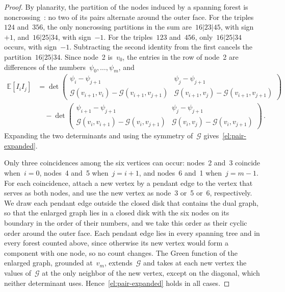 \documentclass[11pt]{amsart}
\numberwithin{equation}{section}
\newcommand{\EE}{\mathbb E}
\begin{document}
\begin{proof}
By planarity, the partition of the nodes induced by a spanning forest is noncrossing~\citep[Section~1.1]{KenyonWilson2011}: no two of its pairs alternate around the outer face. For the triples~$124$ and~$356$, the only noncrossing partitions in the sum are~$16|23|45$, with sign~$+1$, and~$16|25|34$, with sign~$-1$. For the triples~$123$ and~$456$, only~$16|25|34$ occurs, with sign~$-1$. Subtracting the second identity from the first cancels the partition~$16|25|34$. Since node~2 is~$v_0$, the entries in the row of node~2 are differences of the numbers~$\psi_0,\ldots,\psi_m$, and
\begin{align*}
\EE[I_iI_j]
&=\det\begin{pmatrix}
\psi_i-\psi_{j+1}&\psi_j-\psi_{j+1}\\
\mathcal G(v_{i+1},v_i)-\mathcal G(v_{i+1},v_{j+1})&\mathcal G(v_{i+1},v_j)-\mathcal G(v_{i+1},v_{j+1})
\end{pmatrix}\\
&\quad-\det\begin{pmatrix}
\psi_{i+1}-\psi_{j+1}&\psi_j-\psi_{j+1}\\
\mathcal G(v_i,v_{i+1})-\mathcal G(v_i,v_{j+1})&\mathcal G(v_i,v_j)-\mathcal G(v_i,v_{j+1})
\end{pmatrix}\,.
\end{align*}
Expanding the two determinants and using the symmetry of~$\mathcal G$ gives~\eqref{el:pair-expanded}.

Only three coincidences among the six vertices can occur: nodes~2 and~3 coincide when~$i=0$, nodes~4 and~5 when~$j=i+1$, and nodes~6 and~1 when~$j=m-1$. For each coincidence, attach a new vertex by a pendant edge to the vertex that serves as both nodes, and use the new vertex as node~3 or~5 or~6, respectively. We draw each pendant edge outside the closed disk that contains the dual graph, so that the enlarged graph lies in a closed disk with the six nodes on its boundary in the order of their numbers, and we take this order as their cyclic order around the outer face. Each pendant edge lies in every spanning tree and in every forest counted above, since otherwise its new vertex would form a component with one node, so no count changes. The Green function of the enlarged graph, grounded at~$v_m$, extends~$\mathcal G$ and takes at each new vertex the values of~$\mathcal G$ at the only neighbor of the new vertex, except on the diagonal, which neither determinant uses. Hence~\eqref{el:pair-expanded} holds in all cases.
\end{proof}
\end{document}

